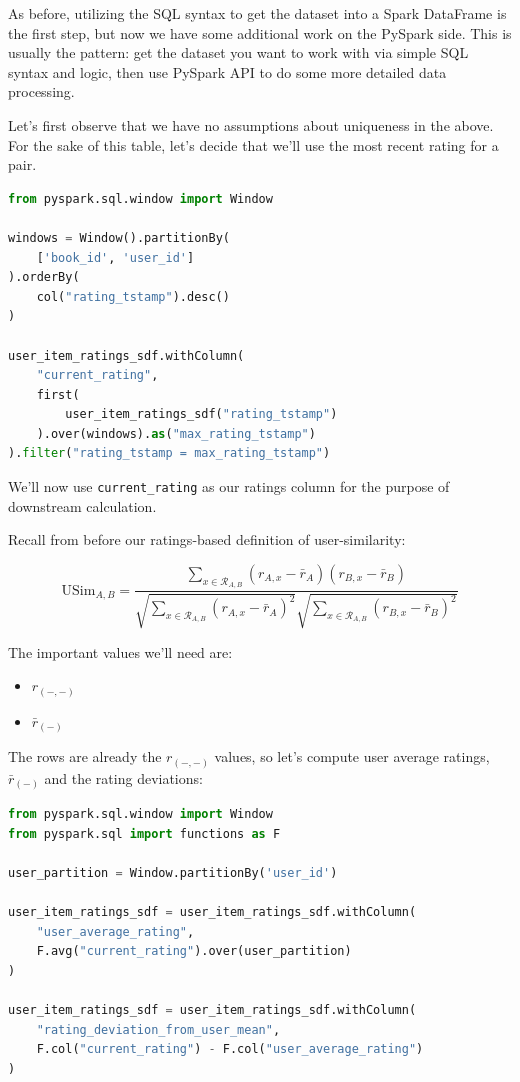 As before, utilizing the SQL syntax to get the dataset into a Spark DataFrame is the first step, but now we have some additional work on the PySpark side. This is usually the pattern: get the dataset you want to work with via simple SQL syntax and logic, then use PySpark API to do some more detailed data processing.

Let's first observe that we have no assumptions about uniqueness in the above. For the sake of this table, let's decide that we'll use the most recent rating for a pair.

\begin{lstlisting}[language=Python]
from pyspark.sql.window import Window

windows = Window().partitionBy(
	['book_id', 'user_id']
).orderBy(
	col("rating_tstamp").desc()
)

user_item_ratings_sdf.withColumn(
	"current_rating", 
	first(
		user_item_ratings_sdf("rating_tstamp")
	).over(windows).as("max_rating_tstamp")
).filter("rating_tstamp = max_rating_tstamp")
\end{lstlisting}

We'll now use \lstinline{current_rating} as our ratings column for the purpose of downstream calculation.

Recall from before our ratings-based definition of user-similarity: 

\begin{equation}
\mathrm{USim}_{A,B}=\frac{\sum_{x\in \mathcal{R}_{A,B}}(r_{A,x}-\bar{r}_A)(r_{B,x}-\bar{r}_B)}{\sqrt{\sum_{x\in \mathcal{R}_{A,B}}(r_{A,x}-\bar{r}_A)^2} \sqrt{\sum_{x\in \mathcal{R}_{A,B}}(r_{B,x}-\bar{r}_B)^2}}    
\end{equation}



The important values we'll need are:

\begin{itemize}
\item $r_{(-,-)}$
\item $\bar{r}_{(-)}$
\end{itemize}

The rows are already the $r_{(-,-)}$ values, so let's compute user average ratings, $\bar{r}_{(-)}$ and the rating deviations:

\begin{lstlisting}[language=Python]
from pyspark.sql.window import Window
from pyspark.sql import functions as F

user_partition = Window.partitionBy('user_id')

user_item_ratings_sdf = user_item_ratings_sdf.withColumn(
	"user_average_rating", 
	F.avg("current_rating").over(user_partition)
)

user_item_ratings_sdf = user_item_ratings_sdf.withColumn(
	"rating_deviation_from_user_mean", 
	F.col("current_rating") - F.col("user_average_rating")
)
\end{lstlisting}

